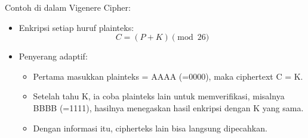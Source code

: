 \documentclass{article}
\begin{document}

Contoh di dalam Vigenere Cipher:

\begin{itemize}
    \item Enkripsi setiap huruf plainteks:
    \[ C = (P + K) \pmod{26} \]
    \item Penyerang adaptif:
    \begin{itemize}
        \item Pertama masukkan plainteks = AAAA (=0000), maka ciphertext C = K.
        \item Setelah tahu K, ia coba plainteks lain untuk memverifikasi, misalnya BBBB (=1111), hasilnya menegaskan hasil enkripsi dengan K yang sama.
        \item Dengan informasi itu, cipherteks lain bisa langsung dipecahkan.
    \end{itemize}
\end{itemize}
\end{document}
